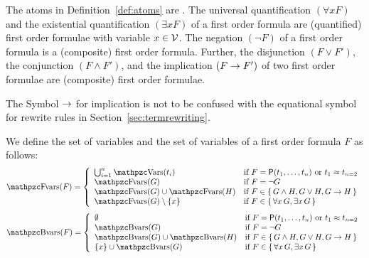 
\begin{definition}[\FOF]\label{def:syntax:FOF}
	The atoms in Definition~\vref{def:atoms} are .
	The universal quantification \( (\forall x F) \)
	and the existential quantification \( (\exists x F) \)
	of a first order formula are (quantified) first order formulae
	with  variable \( x\in\mathcal{V} \).
	The negation \( (\lnot F) \) of a first order formula
	is a (composite) first order formula.
	Further, the disjunction \( (F \lor F') \),
	the conjunction \( (F \land F')  \),
	and the implication \( (F \rightarrow F') \)
	of two first order formulae
	are (composite) first order formulae.
\end{definition}

\begin{remark}
	The Symbol \( \rightarrow \) for implication is not to be confused
	with the equational symbol for rewrite rules in Section~\ref{sec:termrewriting}.
\end{remark}

\begin{definition}\label{def:fof:fvars}\label{def:fof:bvars}
	We define the set of  variables and the set of  variables
	of a first order formula \( F \) as follows:
\begin{gather*}
	\MDEFINE{\fvar(F)}{ll}{
		\bigcup_{i=1}^n \var(t_i) &\text{if }F
		= \mP(t_1,\ldots,t_n)\text{ or }t_1\mEQ{} t_{n=2}
		\\
		\fvar(G)&\text{if }F = \lnot G
		\\
		\fvar(G) \cup \fvar(H)&\text{if }F \in \{ \, G\land H,G \lor H,G\limp H \, \}
		\\
		\fvar (G) \setminus \{ x\} &\text{if } F \in \{ \, \forall x \, G, \exists x \, G \, \}
	}
\end{gather*}
\begin{gather*}
\MDEFINE{\bvar(F)}{ll}{
	\emptyset &\text{if }F = \mP(t_1,\ldots,t_n)\text{ or }t_1\mEQ t_{n=2}
	\\
	\bvar(G)&\text{if }F = \lnot G
	\\
	\bvar(G) \cup \bvar(H)&\text{if }F \in \{ \, G \land H, G \lor H, G \limp H \, \}
	\\
	\{ x\} \cup \bvar (G) &\text{if } F \in \{ \, \forall x \, G, \exists x\,G \, \}
}
\end{gather*}
\end{definition}

